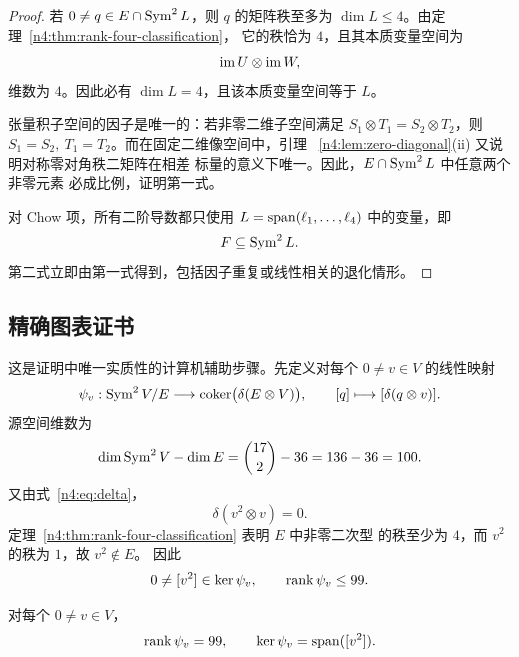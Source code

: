 \begin{proof}
若 \(0\neq q\in E\cap\operatorname{Sym}^2L\)，则 \(q\) 的矩阵秩至多为
\(\dim L\leq4\)。由定理~\ref{n4:thm:rank-four-classification}，
它的秩恰为 \(4\)，且其本质变量空间为
\[
  \operatorname{im} U\otimes\operatorname{im} W,
\]
维数为 \(4\)。因此必有 \(\dim L=4\)，且该本质变量空间等于
\(L\)。

张量积子空间的因子是唯一的：若非零二维子空间满足
\(S_1\otimes T_1=S_2\otimes T_2\)，则
\(S_1=S_2,\ T_1=T_2\)。而在固定二维像空间中，引理
~\ref{n4:lem:zero-diagonal}(ii) 又说明对称零对角秩二矩阵在相差
标量的意义下唯一。因此，\(E\cap\operatorname{Sym}^2L\) 中任意两个非零元素
必成比例，证明第一式。

对 Chow 项，所有二阶导数都只使用
\(L=\operatorname{span}(\ell_1,\ldots,\ell_4)\) 中的变量，即
\[
  F\subseteq\operatorname{Sym}^2L.
\]
第二式立即由第一式得到，包括因子重复或线性相关的退化情形。
\end{proof}

\subsection{精确图表证书}\label{n4:sec:chart}

这是证明中唯一实质性的计算机辅助步骤。先定义对每个
\(0\neq v\in V\) 的线性映射
\begin{equation}\label{n4:eq:psi}
  \psi_v:\operatorname{Sym}^2V/E\longrightarrow
  \operatorname{coker}\bigl(\delta(E\otimes V)\bigr),\qquad
  [q]\longmapsto[\delta(q\otimes v)].
\end{equation}
源空间维数为
\[
  \dim\operatorname{Sym}^2V-\dim E=\binom{17}{2}-36=136-36=100.
\]
又由式~\eqref{n4:eq:delta}，
\[
  \delta(v^2\otimes v)=0.
\]
定理~\ref{n4:thm:rank-four-classification} 表明 \(E\) 中非零二次型
的秩至少为 \(4\)，而 \(v^2\) 的秩为 \(1\)，故 \(v^2\notin E\)。
因此
\begin{equation}\label{n4:eq:obvious-kernel}
  0\neq[v^2]\in\ker\psi_v,\qquad \operatorname{rank}\psi_v\leq99.
\end{equation}

\begin{proposition}[图表证书]\label{n4:prop:chart}
对每个 \(0\neq v\in V\)，
\[
  \operatorname{rank}\psi_v=99,\qquad
  \ker\psi_v=\operatorname{span}([v^2]).
\]
\end{proposition}

